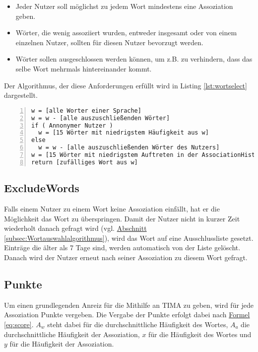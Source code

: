 \begin{itemize}
	\item Jeder Nutzer soll möglichst zu jedem Wort mindestens eine Assoziation geben.
	\item Wörter, die wenig assoziiert wurden, entweder insgesamt oder von einem einzelnen Nutzer, sollten für diesen Nutzer bevorzugt werden.
	\item Wörter sollen ausgeschlossen werden können, um z.B. zu verhindern, dass das selbe Wort mehrmals hintereinander kommt.
\end{itemize}

Der Algorithmus, der diese Anforderungen erfüllt wird in Listing \ref{lst:wortselect} dargestellt.

\begin{lstlisting}[basicstyle=\ttfamily,
backgroundcolor=\color{lightgray},
showspaces=false,
showstringspaces=false,
showtabs=false,
columns=fixed,
frame=lines,
numbers=left,
numbersep=5pt,
breaklines=true,
captionpos=b,
label=lst:wortselect,
caption=Wortauswahlalgorithmus]
w = [alle Worter einer Sprache]
w = w - [alle auszuschließenden Wörter]
if ( Annonymer Nutzer )
  w = [15 Wörter mit niedrigstem Häufigkeit aus w]
else
  w = w - [alle auszuschließenden Wörter des Nutzers]
w = [15 Wörter mit niedrigstem Auftreten in der AssociationHistory des Buntzers1 aus w]
return [zufälliges Wort aus w]
\end{lstlisting}

\subsection{ExcludeWords}\label{subsec:excludewords}
Falls einem Nutzer zu einem Wort keine Assoziation einfällt, hat er die
Möglichkeit das Wort zu überspringen. Damit der Nutzer nicht in kurzer Zeit
wiederholt danach gefragt wird (vgl.
\hyperref[subsec:Wortauswahlalgorithmus]
{Abschnitt \ref*{subsec:Wortauswahlalgorithmus}}), wird das Wort auf eine
Ausschlussliste gesetzt. Einträge die älter als 7 Tage sind, werden
automatisch von der Liste gelöscht. Danach wird der Nutzer erneut nach
seiner Assoziation zu diesem Wort gefragt.

\subsection{Punkte}\label{subsec:punkte}
Um einen grundlegenden Anreiz für die  Mithilfe an TIMA zu geben, wird für jede Assoziation Punkte vergeben. Die Vergabe der Punkte erfolgt dabei nach \hyperref[eq:score]{Formel \ref*{eq:score}}. $ A_w $ steht dabei für die durchschnittliche Häufigkeit des Wortes, $ A_a $ die durchschnittliche Häufigkeit der Assoziation, $ x $ für die Häufigkeit des Wortes und $ y $ für die Häufigkeit der Assoziation.


